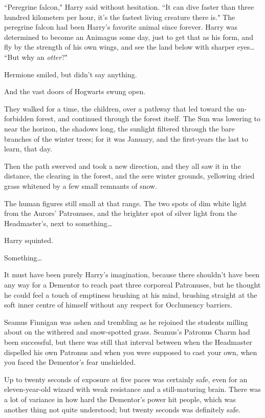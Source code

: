 ``Peregrine falcon," Harry said without hesitation. ``It can dive faster than three hundred kilometers per hour, it's the fastest living creature there is." The peregrine falcon had been Harry's favorite animal since forever. Harry was determined to become an Animagus some day, just to get that as his form, and fly by the strength of his own wings, and see the land below with sharper eyes{\ldots} ``But why an \emph{otter}?"

Hermione smiled, but didn't say anything.

And the vast doors of Hogwarts swung open.

They walked for a time, the children, over a pathway that led toward the un-forbidden forest, and continued through the forest itself. The Sun was lowering to near the horizon, the shadows long, the sunlight filtered through the bare branches of the winter trees; for it was January, and the first-years the last to learn, that day.

Then the path swerved and took a new direction, and they all saw it in the distance, the clearing in the forest, and the sere winter grounds, yellowing dried grass whitened by a few small remnants of snow.

The human figures still small at that range. The two spots of dim white light from the Aurors' Patronuses, and the brighter spot of silver light from the Headmaster's, next to something{\ldots}

Harry squinted.

Something{\ldots}

It must have been purely Harry's imagination, because there shouldn't have been any way for a Dementor to reach past three corporeal Patronuses, but he thought he could feel a touch of emptiness brushing at his mind, brushing straight at the soft inner centre of himself without any respect for Occlumency barriers.

\later

Seamus Finnigan was ashen and trembling as he rejoined the students milling about on the withered and snow-spotted grass. Seamus's Patronus Charm had been successful, but there was still that interval between when the Headmaster dispelled his own Patronus and when you were supposed to cast your own, when you faced the Dementor's fear unshielded.

Up to twenty seconds of exposure at five paces was certainly safe, even for an eleven-year-old wizard with weak resistance and a still-maturing brain. There was a lot of variance in how hard the Dementor's power hit people, which was another thing not quite understood; but twenty seconds was definitely safe.

